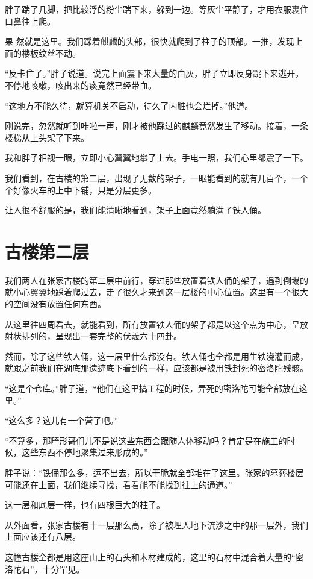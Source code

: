 胖子踹了几脚，把比较浮的粉尘踹下来，躲到一边。等灰尘平静了，才用衣服裹住口鼻往上爬。

果 然就是这里。我们踩着麒麟的头部，很快就爬到了柱子的顶部。一推，发现上面的楼板纹丝不动。

“反卡住了。”胖子说道。说完上面震下来大量的白灰，胖子立即反身跳下来逃开，不停地咳嗽，咳出来的痰竟然已经带血。

“这地方不能久待，就算机关不启动，待久了内脏也会烂掉。”他道。

刚说完，忽然就听到咔啦一声，刚才被他踩过的麒麟竟然发生了移动。接着，一条楼梯从上头架了下来。

我和胖子相视一眼，立即小心翼翼地攀了上去。手电一照，我们心里都震了一下。

我们看到，在古楼的第二层，出现了无数的架子，一眼能看到的就有几百个，一个个好像火车的上中下铺，只是分层更多。

让人很不舒服的是，我们能清晰地看到，架子上面竟然躺满了铁人俑。

\chapter{古楼第二层}

我们两人在张家古楼的第二层中前行，穿过那些放置着铁人俑的架子，遇到倒塌的就小心翼翼地踩着爬过去，走了很久才来到这一层楼的中心位置。这里有一个很大的空间没有放置任何东西。

从这里往四周看去，就能看到，所有放置铁人俑的架子都是以这个点为中心，呈放射状排列的，呈现出一套完整的伏羲六十四卦。

然而，除了这些铁人俑，这一层里什么都没有。铁人俑也全都是用生铁浇灌而成，就跟之前我们在湖底那遗迹底下看到的一样，应该都是被用铁封死的密洛陀残骸。

“这是个仓库。”胖子道，“他们在这里搞工程的时候，弄死的密洛陀可能全部放在这里。”

“这么多？这儿有一个营了吧。”

“不算多，那畸形哥们儿不是说这些东西会跟随人体移动吗？肯定是在施工的时候，这些东西不停地聚集过来形成的。”

胖子说：“铁俑那么多，运不出去，所以干脆就全部堆在了这里。张家的墓葬楼层可能还在上面，我们继续寻找，看看能不能找到往上的通道。”

这一层和底层一样，也有四根巨大的柱子。

从外面看，张家古楼有十一层那么高，除了被埋人地下流沙之中的那一层外，我们上面应该还有八层。

这幢古楼全都是用这座山上的石头和木材建成的，这里的石材中混合着大量的“密洛陀石”，十分罕见。

